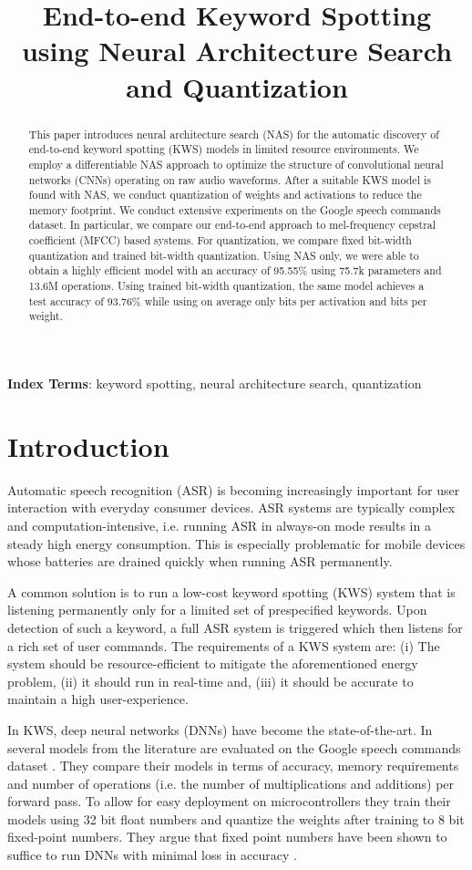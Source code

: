 \documentclass[a4paper]{article}
\title{End-to-end Keyword Spotting using Neural Architecture Search and Quantization}
\begin{document}
\maketitle
\begin{abstract}
This paper introduces neural architecture search (NAS) for the automatic discovery of end-to-end keyword spotting (KWS) models in limited resource environments. We employ a differentiable NAS approach to optimize the structure of convolutional neural networks (CNNs) operating on raw audio waveforms. After a suitable KWS model is found with NAS, we conduct quantization of weights and activations to reduce the memory footprint. We conduct extensive experiments on the Google speech commands dataset. In particular, we compare our end-to-end approach to mel-frequency cepstral coefficient (MFCC) based systems. For quantization, we compare fixed bit-width quantization and trained bit-width quantization. Using NAS only, we were able to obtain a highly efficient model with an accuracy of 95.55\% using 75.7k parameters and 13.6M operations. Using trained bit-width quantization, the same model achieves a test accuracy of 93.76\% while using on average only  bits per activation and  bits per weight.

\end{abstract}
\noindent\textbf{Index Terms}: keyword spotting, neural architecture search, quantization

\section{Introduction}
Automatic speech recognition (ASR) is becoming increasingly important for user interaction with everyday consumer devices. ASR systems are typically complex and computation-intensive, i.e. running ASR in always-on mode results in a steady high energy consumption. This is especially problematic for mobile devices whose batteries are drained quickly when running ASR permanently. 

A common solution is to run a low-cost keyword spotting (KWS) system that is listening permanently only for a limited set of prespecified keywords. Upon detection of such a keyword, a full ASR system is triggered which then listens for a rich set of user commands. The requirements of a KWS system are: (i) The system should be resource-efficient to mitigate the aforementioned energy problem, (ii) it should run in real-time and, (iii) it should be accurate to maintain a high user-experience.

In KWS, deep neural networks (DNNs) have become the state-of-the-art. In \cite{Zhang2017} several models from the literature \cite{Chen2014,Sainath2015,Arik2017,Sun2016} are evaluated on the Google speech commands dataset \cite{Warden2018}. They compare their models in terms of accuracy, memory requirements and number of operations (i.e. the number of multiplications and additions)  per forward pass. To allow for easy deployment on microcontrollers they train their models using 32 bit float numbers and quantize the weights after training to 8 bit fixed-point numbers. They argue that fixed point numbers have been shown to suffice to run DNNs with minimal loss in accuracy \cite{Suda2016,Qiu2016,Lai2017}.
\end{document}
